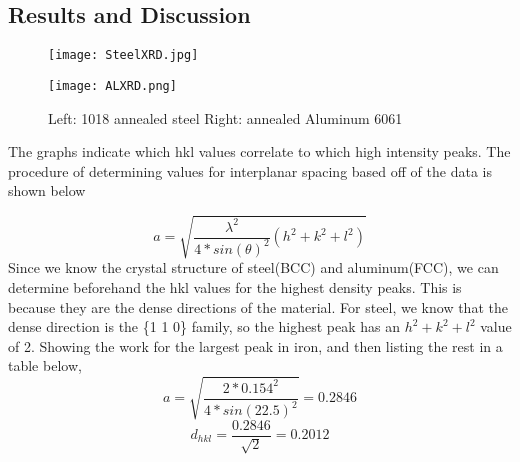 \documentclass{article}
\begin{document}
\subsection{Results and Discussion}

\begin{figure}[h]
	\begin{minipage}{.5\textwidth}
		\centering
		\texttt{[image: SteelXRD.jpg]}
	\end{minipage}		
	\begin{minipage}{.5\textwidth}
		\centering
		\texttt{[image: ALXRD.png]}
	\end{minipage}
	\caption{Left: 1018 annealed steel Right: annealed Aluminum 6061}
\end{figure}

The graphs indicate which hkl values correlate to which high intensity peaks. The procedure of determining values for interplanar spacing based off of the data is shown below

$$a = \sqrt{\frac{\lambda ^2}{4*sin(\theta)^2}(h^2+k^2+l^2)}$$
Since we know the crystal structure of steel(BCC) and aluminum(FCC), we can determine beforehand the hkl values for the highest density peaks. This is because they are the dense directions of the material. For steel, we know that the dense direction is the \{1 1 0\} family, so the highest peak has an $h^2+k^2+l^2$ value of 2. Showing the work for the largest peak in iron, and then listing the rest in a table below,
$$a = \sqrt{\frac{2*0.154^2}{4*sin(22.5)^2}} = 0.2846$$
$$d_{hkl} = \frac{0.2846}{\sqrt{2}} = 0.2012$$
\end{document}

